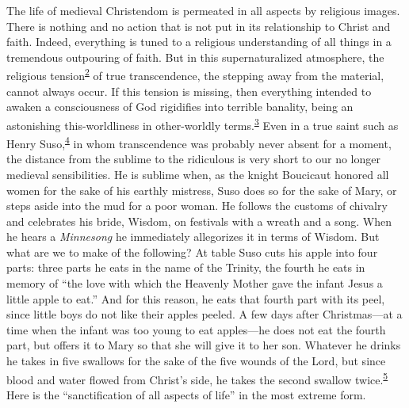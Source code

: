 \protect\hypertarget{13_Chapter_Six__THE_DEPICTION_OF_TH.xhtmlux5cux23page_174}{}{}The
life of medieval Christendom is permeated in all aspects by religious
images. There is nothing and no action that is not put in its
relationship to Christ and faith. Indeed, everything is tuned to a
religious understanding of all things in a tremendous outpouring of
faith. But in this supernaturalized atmosphere, the religious
tension\textsuperscript{\protect\hypertarget{13_Chapter_Six__THE_DEPICTION_OF_TH.xhtmlux5cux23id_1267}{\protect\hyperlink{23_NOTES.xhtmlux5cux23id_1268}{2}}}
of true transcendence, the stepping away from the material, cannot
always occur. If this tension is missing, then everything intended to
awaken a consciousness of God rigidifies into terrible banality, being
an astonishing this-worldliness in other-worldly
terms.\textsuperscript{\protect\hypertarget{13_Chapter_Six__THE_DEPICTION_OF_TH.xhtmlux5cux23id_1265}{\protect\hyperlink{23_NOTES.xhtmlux5cux23id_1266}{3}}}
Even in a true saint such as Henry
Suso,\textsuperscript{\protect\hypertarget{13_Chapter_Six__THE_DEPICTION_OF_TH.xhtmlux5cux23id_1263}{\protect\hyperlink{23_NOTES.xhtmlux5cux23id_1264}{4}}}
in whom transcendence was probably never absent for a moment, the
distance from the sublime to the ridiculous is very short to our no
longer medieval sensibilities. He is sublime when, as the knight
Boucicaut honored all women for the sake of his earthly mistress, Suso
does so for the sake of Mary, or steps aside into the mud for a poor
woman. He follows the customs of chivalry and celebrates his bride,
Wisdom, on festivals with a wreath and a song. When he hears a
\emph{Minnesong} he immediately allegorizes it in terms of Wisdom. But
what are we to make of the following? At table Suso cuts his apple into
four parts: three parts he eats in the name of the Trinity, the fourth
he eats in memory of ``the love with which the Heavenly Mother gave the
infant Jesus a little apple to eat.'' And for this reason, he eats that
fourth part with its peel, since little boys do not like their apples
peeled. A few days after Christmas---at a time when the infant was too
young to eat apples---he does not eat the fourth part, but offers it to
Mary so that she will give it to her son. Whatever he drinks he takes in
five swallows for the sake of the five wounds of the Lord, but since
blood and water flowed from Christ's side, he takes the second swallow
twice.\textsuperscript{\protect\hypertarget{13_Chapter_Six__THE_DEPICTION_OF_TH.xhtmlux5cux23id_1261}{\protect\hyperlink{23_NOTES.xhtmlux5cux23id_1262}{5}}}
Here is the ``sanctification of all aspects of life'' in the most
extreme form.

